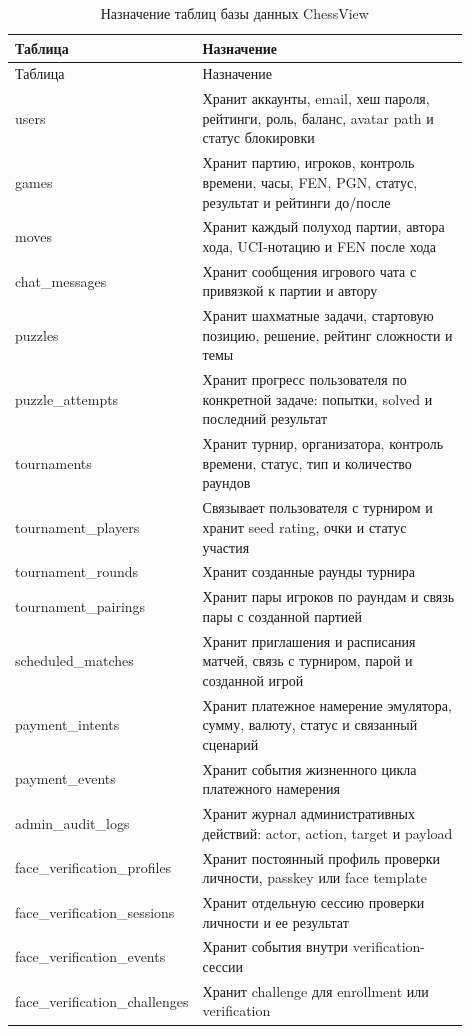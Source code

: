 \noindent\scriptsize
\setlength{\tabcolsep}{3pt}
\renewcommand{\arraystretch}{1.14}
\begin{longtable}{|>{\RaggedRight\arraybackslash}p{0.24\linewidth}|>{\RaggedRight\arraybackslash}p{0.66\linewidth}|}
\caption{Назначение таблиц базы данных ChessView}\label{tab:db-tables}\\
\hline
Таблица & Назначение\\ \hline
\endfirsthead
\hline
Таблица & Назначение\\ \hline
\endhead
users & Хранит аккаунты, email, хеш пароля, рейтинги, роль, баланс, avatar path и статус блокировки\\ \hline
games & Хранит партию, игроков, контроль времени, часы, FEN, PGN, статус, результат и рейтинги до/после\\ \hline
moves & Хранит каждый полуход партии, автора хода, UCI-нотацию и FEN после хода\\ \hline
chat_messages & Хранит сообщения игрового чата с привязкой к партии и автору\\ \hline
puzzles & Хранит шахматные задачи, стартовую позицию, решение, рейтинг сложности и темы\\ \hline
puzzle_attempts & Хранит прогресс пользователя по конкретной задаче: попытки, solved и последний результат\\ \hline
tournaments & Хранит турнир, организатора, контроль времени, статус, тип и количество раундов\\ \hline
tournament_players & Связывает пользователя с турниром и хранит seed rating, очки и статус участия\\ \hline
tournament_rounds & Хранит созданные раунды турнира\\ \hline
tournament_pairings & Хранит пары игроков по раундам и связь пары с созданной партией\\ \hline
scheduled_matches & Хранит приглашения и расписания матчей, связь с турниром, парой и созданной игрой\\ \hline
payment_intents & Хранит платежное намерение эмулятора, сумму, валюту, статус и связанный сценарий\\ \hline
payment_events & Хранит события жизненного цикла платежного намерения\\ \hline
admin_audit_logs & Хранит журнал административных действий: actor, action, target и payload\\ \hline
face_verification_profiles & Хранит постоянный профиль проверки личности, passkey или face template\\ \hline
face_verification_sessions & Хранит отдельную сессию проверки личности и ее результат\\ \hline
face_verification_events & Хранит события внутри verification-сессии\\ \hline
face_verification_challenges & Хранит challenge для enrollment или verification\\ \hline
\end{longtable}
\normalsize

